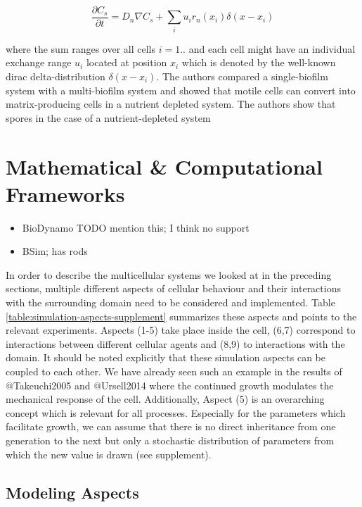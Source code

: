 \documentclass{article}
\begin{document}
\begin{equation}
    \frac{\partial C_s}{\partial t} = D_n \nabla C_s  + \sum\limits_i u_i r_n (x_i) \delta(x-x_i)
\end{equation}

where the sum ranges over all cells $i=1..$ and each cell might have an individual exchange range
$u_i$ located at position $x_i$ which is denoted by the well-known dirac delta-distribution
$\delta(x-x_i)$.
The authors compared a single-biofilm system with a multi-biofilm system and showed that
motile cells can convert into matrix-producing cells in a nutrient depleted system.
The authors show that spores in the case of a nutrient-depleted system

\section{Mathematical \& Computational Frameworks}

\begin{itemize}
    \item \cite{breitwieser_biodynamo_2022} BioDynamo TODO mention this; I think no support
    \item \cite{Gorochowski2012,Matyjaszkiewicz2017} BSim; has rods
\end{itemize}

In order to describe the multicellular systems we looked at in the preceding sections, multiple
different aspects of cellular behaviour and their interactions with the surrounding domain need to
be considered and implemented.
Table \ref{table:simulation-aspects-supplement} summarizes these aspects and points to the relevant
experiments.
Aspects (1-5) take place inside the cell, (6,7) correspond to interactions between different
cellular agents and (8,9) to interactions with the domain.
It should be noted explicitly that these simulation aspects can be coupled to each other.
We have already seen such an example in the results of @Takeuchi2005 and @Ursell2014 where the
continued growth modulates the mechanical response of the cell.
Additionally, Aspect (5) is an overarching concept which is relevant for all processes.
Especially for the parameters which facilitate growth, we can assume that there is no direct
inheritance from one generation to the next but only a stochastic distribution of parameters from
which the new value is drawn (see supplement).

\subsection{Modeling Aspects}
\end{document}
